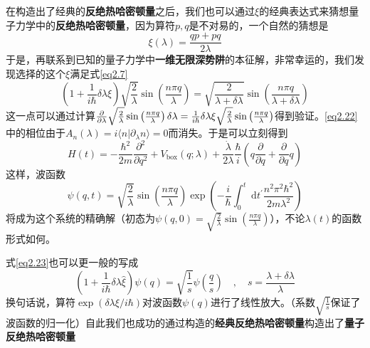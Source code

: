 在构造出了经典的\textbf{反绝热哈密顿量}之后，我们也可以通过$\xi$的经典表达式来猜想量子力学中的\textbf{反绝热哈密顿量}，因为算符$p, q$是不对易的，一个自然的猜想是
\begin{equation}
    \xi(\lambda) = \frac{q p + p q}{2 \lambda}
    \label{eq2.21}
\end{equation}
于是，再联系到已知的量子力学中\textbf{一维无限深势阱}的本征解，非常幸运的，我们发现选择的这个$\xi$满足式\eqref{eq2.7}
\begin{equation}
    \left(1+\frac{1}{i \hbar} \delta \lambda \xi \right) \sqrt{\frac{2}{\lambda}} \sin \left(\frac{n \pi q}{\lambda}\right)=\sqrt{\frac{2}{\lambda+\delta \lambda}} \sin \left(\frac{n \pi q}{\lambda+\delta \lambda}\right)
    \label{eq2.22}
\end{equation}
这一点可以通过计算$\frac{\partial }{\partial \lambda} \sqrt{\frac{2}{\lambda}} \sin \left(\frac{n \pi q}{\lambda}\right) \delta \lambda = \frac{1}{i \hbar} \delta \lambda \xi \sqrt{\frac{2}{\lambda}} \sin \left(\frac{n \pi q}{\lambda}\right)$得到验证。\eqref{eq2.22}中的相位由于$A_{n}(\lambda)=i\langle n | \partial_\lambda  n\rangle = 0$而消失。于是可以立刻得到
\begin{equation}
    H(t)=-\frac{\hbar^{2}}{2 m} \frac{\partial^{2}}{\partial q^{2}}+V_{\mathrm{box}}(q ; \lambda)+\frac{\dot{\lambda}}{2 \lambda} \frac{\hbar}{i}\left(q \frac{\partial}{\partial q}+\frac{\partial}{\partial q} q\right)
    \label{eq2.23}
\end{equation}
这样，波函数
\begin{equation}
    \psi (q, t)=\sqrt{\frac{2}{\lambda}} \sin \left(\frac{n \pi q}{\lambda}\right) \exp \left(-\frac{i}{\hbar} \int_{0}^{t} \mathrm{~d} t^{\prime} \frac{n^{2} \pi^{2} \hbar^{2}}{2 m \lambda^{2}}\right)
    \label{eq2.24}
\end{equation}
将成为这个系统的精确解（初态为$\psi (q, 0) = \sqrt{\frac{2}{\lambda}} \sin \left(\frac{n \pi q}{\lambda}\right)$），不论$\lambda(t)$的函数形式如何。

式\eqref{eq2.23}也可以更一般的写成
\begin{equation}
    \left(1+\frac{1}{i \hbar} \delta \lambda \hat{\xi}\right) \psi(q)=\sqrt{\frac{1}{s}} \psi\left(\frac{q}{s}\right) \quad, \quad s=\frac{\lambda+\delta \lambda}{\lambda}
    \label{eq2.25}
\end{equation}
换句话说，算符$\exp (\delta \lambda \xi / i \hbar)$对波函数$\psi(q)$进行了线性放大。（系数$\sqrt{\frac{1}{s}}$保证了波函数的归一化）自此我们也成功的通过构造的\textbf{经典反绝热哈密顿量}构造出了\textbf{量子反绝热哈密顿量}

